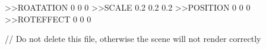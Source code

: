 >>ROATATION
0
0
0
>>SCALE
0.2
0.2
0.2
>>POSITION
0
0
0
>>ROTEFFECT
0
0
0

// Do not delete this file, otherwise the scene will not render correctly

